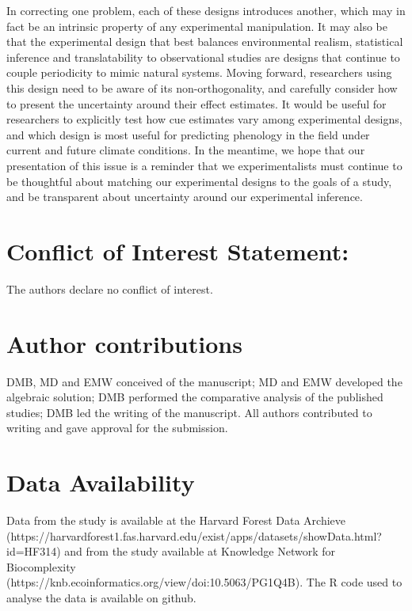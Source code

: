 \documentclass[11pt]{article}
\begin{document}
In correcting one problem, each of these designs introduces another, which may in fact be an intrinsic property of any experimental manipulation.
 It may also be that the experimental design that best balances environmental realism, statistical inference and translatability to observational studies are designs that continue to couple periodicity to mimic natural systems. Moving forward, researchers using this design need to be aware of its non-orthogonality, and carefully consider how to present the uncertainty around their effect estimates. It would be useful for researchers to explicitly test how cue estimates vary among experimental designs, and which design is most useful for predicting phenology in the field under current and future climate conditions. In the meantime, we hope that our presentation of this issue is a reminder that we experimentalists must continue to be thoughtful about matching our experimental designs to the goals of a study, and be transparent about uncertainty around our experimental inference.

\section*{Conflict of Interest Statement:}
The authors declare no conflict of interest.

\section*{Author contributions}
DMB, MD and EMW conceived of the manuscript; MD and EMW developed the algebraic solution; DMB performed the comparative analysis of the published studies; DMB led the writing of the manuscript. All authors contributed to writing and gave approval for the submission.

\section*{Data Availability}
Data from the \cite{Flynn2018} study is available at the Harvard Forest Data Archieve (https://harvardforest1.fas.harvard.edu/exist/apps/datasets/showData.html?id=HF314) and from the \citet{Buonaiuto:2021ug} study available at Knowledge Network for Biocomplexity\\ (https://knb.ecoinformatics.org/view/doi:10.5063/PG1Q4B). The R code used to analyse the data is available on github.

\pagebreak	

\end{document}
